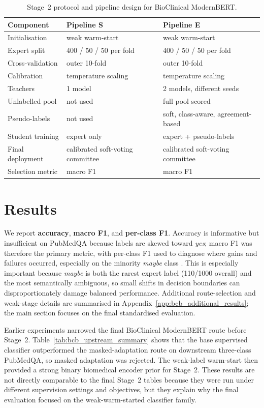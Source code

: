 \documentclass{article}
\begin{document}
\begin{table}[H]
\centering
\caption{Stage~2 protocol and pipeline design for BioClinical ModernBERT.}
\label{tab:bcb_main_protocol}
\small
\begin{tabular}{lll}
\hline
\textbf{Component} & \textbf{Pipeline S} & \textbf{Pipeline E} \\
\hline
Initialisation & weak warm-start & weak warm-start \\
Expert split & 400 / 50 / 50 per fold & 400 / 50 / 50 per fold \\
Cross-validation & outer 10-fold & outer 10-fold \\
Calibration & temperature scaling & temperature scaling \\
Teachers & 1 model & 2 models, different seeds \\
Unlabelled pool & not used & full pool scored \\
Pseudo-labels & not used & soft, class-aware, agreement-based \\
Student training & expert only & expert + pseudo-labels \\
Final deployment & calibrated soft-voting committee & calibrated soft-voting committee \\
Selection metric & macro F1 & macro F1 \\
\hline
\end{tabular}
\end{table}


\section{Results}

We report \textbf{accuracy}, \textbf{macro F1}, and \textbf{per-class F1}. Accuracy is informative but insufficient on PubMedQA because labels are skewed toward \textit{yes}; macro F1 was therefore the primary metric, with per-class F1 used to diagnose where gains and failures occurred, especially on the minority \textit{maybe} class \citep{Younes2022}. This is especially important because \textit{maybe} is both the rarest expert label (110/1000 overall) and the most semantically ambiguous, so small shifts in decision boundaries can disproportionately damage balanced performance. Additional route-selection and weak-stage details are summarised in Appendix~\ref{app:bcb_additional_results}; the main section focuses on the final standardised evaluation.

Earlier experiments narrowed the final BioClinical ModernBERT route before Stage~2. Table~\ref{tab:bcb_upstream_summary} shows that the base supervised classifier outperformed the masked-adaptation route on downstream three-class PubMedQA, so masked adaptation was rejected. The weak-label warm-start then provided a strong binary biomedical encoder prior for Stage~2. These results are not directly comparable to the final Stage~2 tables because they were run under different supervision settings and objectives, but they explain why the final evaluation focused on the weak-warm-started classifier family.
\end{document}
